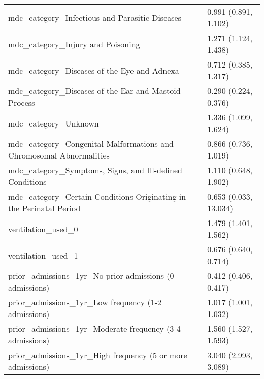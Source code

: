 \begin{tabular}{ll}
mdc_category_Infectious and Parasitic Diseases & 0.991 (0.891, 1.102) \\
mdc_category_Injury and Poisoning & 1.271 (1.124, 1.438) \\
mdc_category_Diseases of the Eye and Adnexa & 0.712 (0.385, 1.317) \\
mdc_category_Diseases of the Ear and Mastoid Process & 0.290 (0.224, 0.376) \\
mdc_category_Unknown & 1.336 (1.099, 1.624) \\
mdc_category_Congenital Malformations and Chromosomal Abnormalities & 0.866 (0.736, 1.019) \\
mdc_category_Symptoms, Signs, and Ill-defined Conditions & 1.110 (0.648, 1.902) \\
mdc_category_Certain Conditions Originating in the Perinatal Period & 0.653 (0.033, 13.034) \\
ventilation_used_0 & 1.479 (1.401, 1.562) \\
ventilation_used_1 & 0.676 (0.640, 0.714) \\
prior_admissions_1yr_No prior admissions (0 admissions) & 0.412 (0.406, 0.417) \\
prior_admissions_1yr_Low frequency (1-2 admissions) & 1.017 (1.001, 1.032) \\
prior_admissions_1yr_Moderate frequency (3-4 admissions) & 1.560 (1.527, 1.593) \\
prior_admissions_1yr_High frequency (5 or more admissions) & 3.040 (2.993, 3.089) \\
\bottomrule
\end{tabular}
